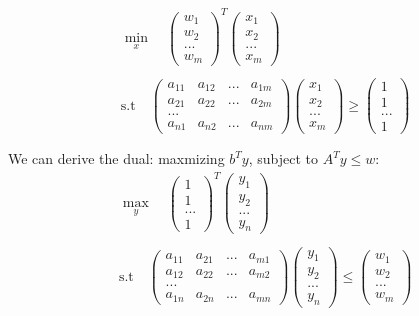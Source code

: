 \documentclass{article}
\begin{document}
\[
\begin{aligned}
&\min_x \quad \begin{pmatrix} w_1 \\ w_2 \\ ... \\ w_m \end{pmatrix}^{T} \begin{pmatrix} x_1 \\ x_2 \\ ... \\ x_m \end{pmatrix} \\\\
&\text{s.t} \quad \begin{pmatrix} a_{11} & a_{12} & ... & a_{1m} \\ a_{21} & a_{22} & ... & a_{2m} \\ ... \\ a_{n1} & a_{n2} & ... & a_{nm} \end{pmatrix} \begin{pmatrix} x_1 \\ x_2 \\ ... \\ x_m \end{pmatrix} \geq \begin{pmatrix} 1 \\ 1 \\ ... \\ 1 \end{pmatrix} \\\\
\end{aligned} 
\]
We can derive the dual: maxmizing $b^{T}y$, subject to $A^Ty \leq w$:
\[
\begin{aligned}
&\max_y \quad \begin{pmatrix} 1 \\ 1 \\ ... \\ 1 \end{pmatrix}^{T} \begin{pmatrix} y_1 \\ y_2 \\ ... \\ y_n \end{pmatrix} \\\\
&\text{s.t} \quad \begin{pmatrix} a_{11} & a_{21} & ... & a_{m1} \\ a_{12} & a_{22} & ... & a_{m2} \\ ... \\ a_{1n} & a_{2n} & ... & a_{mn} \end{pmatrix} \begin{pmatrix} y_1 \\ y_2 \\ ... \\ y_n \end{pmatrix} \leq \begin{pmatrix} w_1 \\ w_2 \\ ... \\ w_m \end{pmatrix}
\end{aligned} 
\]
\end{document}
